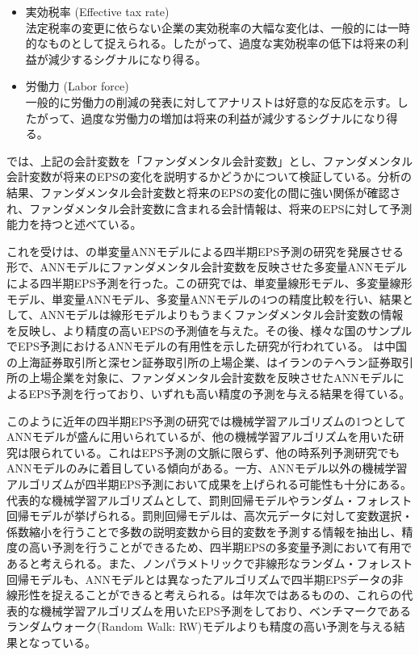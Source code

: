 \documentclass[a4paper, 12pt]{jsreport}
\begin{document}
\begin{itemize}
\item 実効税率 (Effective tax rate) \\
    法定税率の変更に依らない企業の実効税率の大幅な変化は、一般的には一時的なものとして捉えられる。したがって、過度な実効税率の低下は将来の利益が減少するシグナルになり得る。

\item 労働力 (Labor force) \\
    一般的に労働力の削減の発表に対してアナリストは好意的な反応を示す。したがって、過度な労働力の増加は将来の利益が減少するシグナルになり得る。
\end{itemize}

\cite*{abarbanell1997fundamental}では、上記の会計変数を「ファンダメンタル会計変数」とし、ファンダメンタル会計変数が将来のEPSの変化を説明するかどうかについて検証している。分析の結果、ファンダメンタル会計変数と将来のEPSの変化の間に強い関係が確認され、ファンダメンタル会計変数に含まれる会計情報は、将来のEPSに対して予測能力を持つと述べている。

これを受け\cite{zhang2004neural}は、\cite{callen1996neural}の単変量ANNモデルによる四半期EPS予測の研究を発展させる形で、ANNモデルにファンダメンタル会計変数を反映させた多変量ANNモデルによる四半期EPS予測を行った。この研究では、単変量線形モデル、多変量線形モデル、単変量ANNモデル、多変量ANNモデルの4つの精度比較を行い、結果として、ANNモデルは線形モデルよりもうまくファンダメンタル会計変数の情報を反映し、より精度の高いEPSの予測値を与えた。その後、様々な国のサンプルでEPS予測におけるANNモデルの有用性を示した研究が行われている。\cite*{cao2009forecasting} は中国の上海証券取引所と深セン証券取引所の上場企業、\cite{etemadi2015earnings}はイランのテヘラン証券取引所の上場企業を対象に、ファンダメンタル会計変数を反映させたANNモデルによるEPS予測を行っており、いずれも高い精度の予測を与える結果を得ている。

このように近年の四半期EPS予測の研究では機械学習アルゴリズムの1つとしてANNモデルが盛んに用いられているが、他の機械学習アルゴリズムを用いた研究は限られている。これはEPS予測の文脈に限らず、他の時系列予測研究でもANNモデルのみに着目している傾向がある\citep{ahmed2010empirical}。一方、ANNモデル以外の機械学習アルゴリズムが四半期EPS予測において成果を上げられる可能性も十分にある。代表的な機械学習アルゴリズムとして、罰則回帰モデルやランダム・フォレスト回帰モデルが挙げられる\citep{hastie2009esl}。罰則回帰モデルは、高次元データに対して変数選択・係数縮小を行うことで多数の説明変数から目的変数を予測する情報を抽出し、精度の高い予測を行うことができるため、四半期EPSの多変量予測において有用であると考えられる。また、ノンパラメトリックで非線形なランダム・フォレスト回帰モデル\citep{breiman2001random}も、ANNモデルとは異なったアルゴリズムで四半期EPSデータの非線形性を捉えることができると考えられる。\cite*{cao2020fundamental}は年次ではあるものの、これらの代表的な機械学習アルゴリズムを用いたEPS予測をしており、ベンチマークであるランダムウォーク(Random Walk: RW)モデルよりも精度の高い予測を与える結果となっている。
\end{document}
